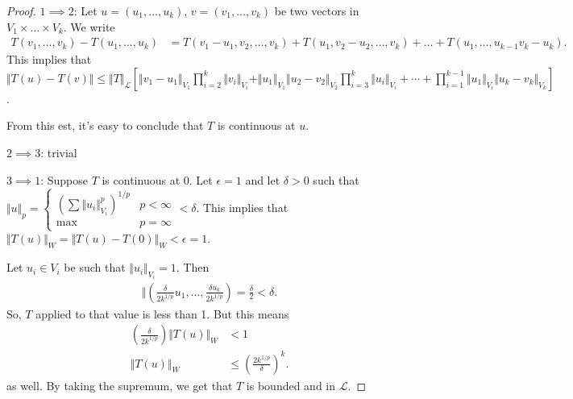 \documentclass{report}
\begin{document}
\begin{proof}
    $1 \implies 2$: Let $u = (u_1, \ldots, u_k)$, $v = (v_1, \ldots, v_k)$ be two vectors in $V_1 \times \ldots \times V_k$. We write
    \begin{align*}
        T(v_1, \ldots, v_k) - T(u_1, \ldots, u_k) &= T(v_1 - u_1, v_2, \ldots, v_k) + T(u_1, v_2 - u_2, \ldots, v_k) + \ldots + T(u_1, \ldots, u_{k-1} v_k - u_k).    \end{align*}
        This implies that $\Vert T(u) - T(v) \Vert \leq \Vert T \Vert_{\mathcal L} \left[ \Vert v_1 - u_1 \Vert_{V_1} \prod_{i = 2}^k \Vert v_i \Vert_{V_i}  + \Vert u_1 \Vert_{V_1} \Vert u_2 - v_2 \Vert_{V_2} \prod_{i = 3}^k \Vert u_i \Vert_{V_i} + \cdots + \prod_{i=1}^{k-1}\Vert u_1 \Vert_{V_i} \Vert u_k - v_k \Vert_{V_k} \right]$.

    From this est, it's easy to conclude that $T$ is continuous at $u$.

    $2 \implies 3$: trivial

    $3 \implies 1$: Suppose $T$ is continuous at 0. Let $\epsilon = 1$ and let $\delta > 0$ such that $\Vert u \Vert_p = \begin{cases}
    \left( \sum \Vert u_i \Vert_{V_i}^p \right)^{1/p} & p < \infty \\
    \max & p = \infty
    \end{cases} < \delta$. This implies that $\Vert T(u) \Vert_W = \Vert T(u) - T(0) \Vert_W < \epsilon = 1$.

    Let $u_i \in V_i$ be such that $\Vert u_i \Vert_{V_i} = 1$. Then 
    \begin{align*}
        \Vert \left( \frac{\delta}{2k^{1/p}} u_1, \ldots, \frac{\delta u_k}{2k^{1/p}}\right) = \frac \delta 2 < \delta.
    \end{align*}
    So, $T$ applied to that value is less than 1. But this means 
    \begin{align*}
        \left( \frac{\delta}{2k^{1/p}}\right) \Vert T(u) \Vert_W &< 1 \\
        \Vert T(u) \Vert_W &\leq \left( \frac{2k^{1/p}}{\delta} \right)^k.
    \end{align*}
    as well. By taking the supremum, we get that $T$ is bounded and in $\mathcal L$. 
\end{proof}
\end{document}

